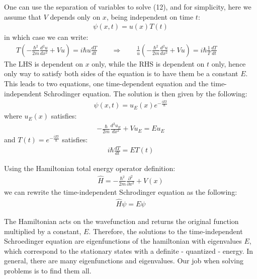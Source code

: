 \documentclass[11pt]{article}
\theoremstyle{break}
\theoremstyle{break}
\begin{document}
One can use the separation of variables to solve (12), and for simplicity, here we assume that $V$ depends only on $x$, being independent on time $t$:
\begin{align*}
\psi(x,t) = u(x)T(t) 
\end{align*}
in which case we can write:
\begin{align*}
T\left( -\frac{\hbar^2}{2m}\frac{d^2u}{dx^2} + V u\right) = i\hbar u \frac{dT}{dt}\qquad\Rightarrow\qquad  
\frac{1}{u}\left( -\frac{\hbar^2}{2m}\frac{d^2u}{dx^2} + V u\right) = i\hbar \frac{1}{T} \frac{dT}{dt}\qquad\qquad 
\end{align*}
The LHS is dependent on $x$ only, while the RHS is dependent on $t$ only, hence only way to satisfy both sides of the equation is to have them be a constant $E$. This leads to two equations, one time-dependent equation and the time-independent Schrodinger equation. The solution is then given by the following:
\begin{align*}
\psi(x,t) = u_E(x) e^{-\frac{iEt}{\hbar}}
\end{align*}
where $u_E(x)$ satisfies:
\begin{align*}
-\frac{\hbar}{2m}\frac{d^2u_E}{dx^2} + V u_E = Eu_E
\end{align*}
and $ T(t) = e^{-\frac{iEt}{\hbar}}$ satisfies:
\begin{align*}
i\hbar \frac{dT}{dt} = ET(t)
\end{align*}

Using the Hamiltonian total energy operator definition:
\begin{align*}
\hat{H} = -\frac{\hbar^2}{2m}\frac{\partial^2}{\partial x^2} + V(x)
\end{align*}
we can rewrite the time-independent Schrodinger equation as the following:
\begin{align*}
\hat{H}\psi = E\psi	
\end{align*}

The Hamiltonian acts on the wavefunction and returns the original function multiplied by a constant, $E$. Therefore, the solutions to the time-independent Schroedinger equation are eigenfunctions of the hamiltonian with eigenvalues $E$, which correspond to the stationary states with a definite - quantized - energy. In general, there are many eigenfunctions and eigenvalues. Our job when solving problems is to find them all.\\
\end{document}
